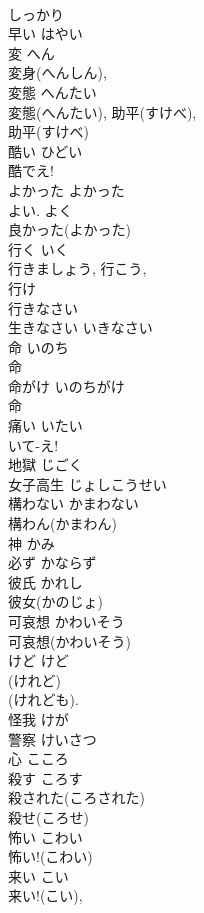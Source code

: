 \documentclass[8pt]{extreport}
\begin{document}
\begin{CJK}{UTF8}{min}
\\	しっかり 
\\	早い	はやい	
\\	変	へん	
\\	変身(へんしん), 
\\	変態	へんたい	
\\	変態(へんたい), 助平(すけべ), 
\\	助平(すけべ) 
\\	酷い	ひどい	
\\	酷でえ!
\\	よかった	よかった	
\\	よい. よく
\\	良かった(よかった) 
\\	行く	いく	
\\	行きましょう, 行こう, 
\\	行け 
\\	行きなさい 
\\	生きなさい	いきなさい	
\\	命	いのち	
\\	命 
\\	命がけ	いのちがけ	
\\	命 
\\	痛い	いたい	
\\	いて-え!	
\\	地獄	じごく	
\\	女子高生	じょしこうせい	
\\	構わない	かまわない	
\\	構わん(かまわん) 
\\	神	かみ	
\\	必ず	かならず	
\\	彼氏	かれし	
\\	彼女(かのじょ) 
\\	可哀想	かわいそう	
\\	可哀想(かわいそう) 
\\	けど	けど	
\\	(けれど) 
\\	(けれども). 
\\	怪我	けが	
\\	警察	けいさつ	
\\	心	こころ	
\\	殺す	ころす	
\\	殺された(ころされた) 
\\	殺せ(ころせ)	
\\	怖い	こわい	
\\	怖い!(こわい) 
\\	来い	こい	
\\	来い!(こい), 

\end{CJK}
\end{document}
